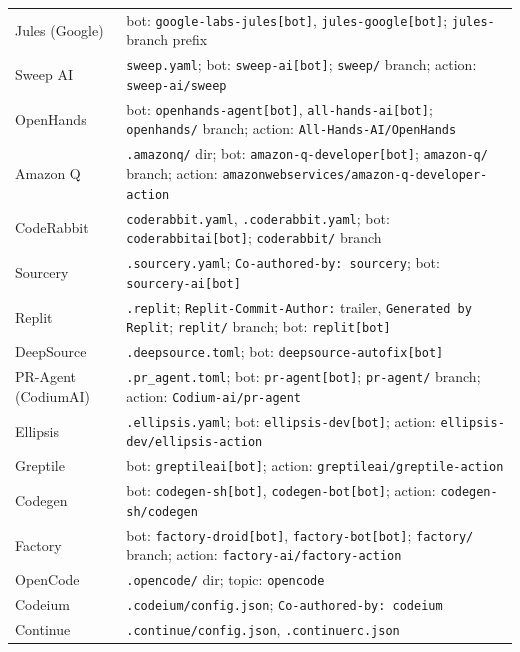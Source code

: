 \documentclass[9pt,a4paper]{article}
\begin{document}
\begin{tabular}{@{}lp{13.5cm}@{}}
Jules (Google) &
  bot: \texttt{google-labs-jules[bot]}, \texttt{jules-google[bot]};
  \texttt{jules-} branch prefix \\[2pt]
Sweep AI &
  \texttt{sweep.yaml}; bot: \texttt{sweep-ai[bot]}; \texttt{sweep/} branch;
  action: \texttt{sweep-ai/sweep} \\[2pt]
OpenHands &
  bot: \texttt{openhands-agent[bot]}, \texttt{all-hands-ai[bot]}; \texttt{openhands/} branch;
  action: \texttt{All-Hands-AI/OpenHands} \\[2pt]
Amazon Q &
  \texttt{.amazonq/} dir; bot: \texttt{amazon-q-developer[bot]}; \texttt{amazon-q/} branch;
  action: \texttt{amazonwebservices/amazon-q-developer-action} \\[2pt]
CodeRabbit &
  \texttt{coderabbit.yaml}, \texttt{.coderabbit.yaml};
  bot: \texttt{coderabbitai[bot]}; \texttt{coderabbit/} branch \\[2pt]
Sourcery &
  \texttt{.sourcery.yaml};
  \texttt{Co-authored-by: sourcery}; bot: \texttt{sourcery-ai[bot]} \\[2pt]
Replit &
  \texttt{.replit}; \texttt{Replit-Commit-Author:} trailer,
  \texttt{Generated by Replit}; \texttt{replit/} branch;
  bot: \texttt{replit[bot]} \\[2pt]
DeepSource &
  \texttt{.deepsource.toml}; bot: \texttt{deepsource-autofix[bot]} \\[2pt]
PR-Agent (CodiumAI) &
  \texttt{.pr\_agent.toml}; bot: \texttt{pr-agent[bot]}; \texttt{pr-agent/} branch;
  action: \texttt{Codium-ai/pr-agent} \\[2pt]
Ellipsis &
  \texttt{.ellipsis.yaml}; bot: \texttt{ellipsis-dev[bot]};
  action: \texttt{ellipsis-dev/ellipsis-action} \\[2pt]
Greptile &
  bot: \texttt{greptileai[bot]};
  action: \texttt{greptileai/greptile-action} \\[2pt]
Codegen &
  bot: \texttt{codegen-sh[bot]}, \texttt{codegen-bot[bot]};
  action: \texttt{codegen-sh/codegen} \\[2pt]
Factory &
  bot: \texttt{factory-droid[bot]}, \texttt{factory-bot[bot]}; \texttt{factory/} branch;
  action: \texttt{factory-ai/factory-action} \\[2pt]
OpenCode &
  \texttt{.opencode/} dir; topic: \texttt{opencode} \\[2pt]
Codeium &
  \texttt{.codeium/config.json};
  \texttt{Co-authored-by: codeium} \\[2pt]
Continue &
  \texttt{.continue/config.json}, \texttt{.continuerc.json} \\[2pt]

\end{tabular}
\end{document}

